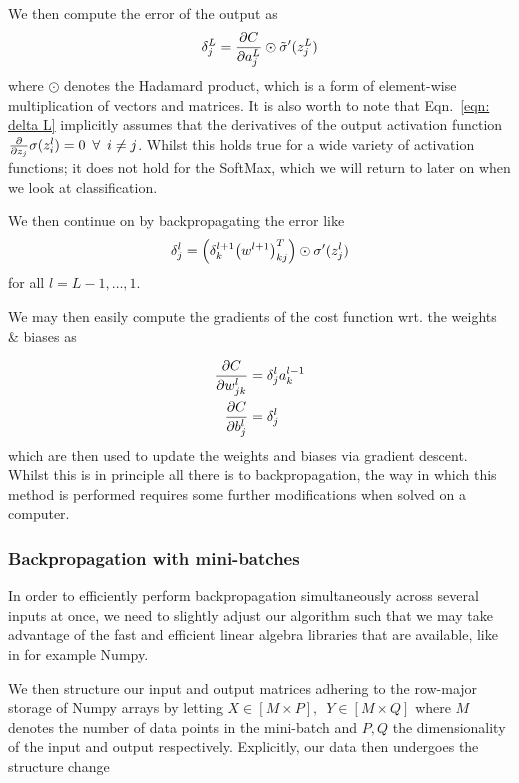\documentclass[reprint, english, nofootinbib]{revtex4-2}
\begin{document}
We then compute the error of the output as
\begin{equation}\label{eqn: delta L}
    \delta^{L}_j = \pdv{C}{a^{L}_{j}} \odot \tilde\sigma'(z^{L}_j)
\end{equation}
where $\odot$ denotes the Hadamard product, which is a form of element-wise multiplication of vectors and matrices. It is also worth to note that Eqn.~\ref{eqn: delta L} implicitly assumes that the derivatives of the output activation function $\pdv{z_j}\sigma(z^l_i) = 0 \enspace \forall \enspace i\neq j$. Whilst this holds true for a wide variety of activation functions; it does not hold for the SoftMax, which we will return to later on when we look at classification.

We then continue on by backpropagating the error like
\begin{equation}
    \delta^{l}_j = \qty(\delta^{l+1}_{k}\qty(w^{l+1})^T_{kj}) \odot \sigma'(z^l_j)
\end{equation}
for all $l = L-1, \dots, 1$.

We may then easily compute the gradients of the cost function wrt. the weights \& biases as

\begin{align}
    \begin{split}
        \pdv{C}{w_{jk}^l} &= \delta_j^l a^{l-1}_k \\
        \pdv{C}{b^l_j} &= \delta_j^l
    \end{split}
\end{align}
which are then used to update the weights and biases via gradient descent. Whilst this is in principle all there is to backpropagation, the way in which this method is performed requires some further modifications when solved on a computer.

\subsubsection{Backpropagation with mini-batches}
\noindent
In order to efficiently perform backpropagation simultaneously across several inputs at once, we need to slightly adjust our algorithm such that we may take advantage of the fast and efficient linear algebra libraries that are available, like in for example Numpy.

We then structure our input and output matrices adhering to the row-major storage of Numpy arrays by letting $X\in[M\times P], \enspace Y\in[M\times Q]$ where $M$ denotes the number of data points in the mini-batch and $P, Q$ the dimensionality of the input and output respectively. Explicitly, our data then undergoes the structure change
\end{document}
